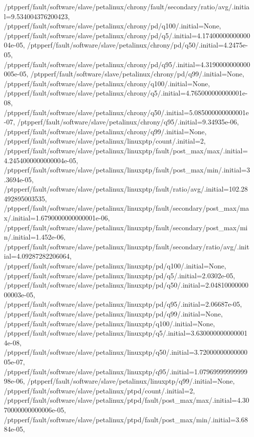 {    /ptpperf/fault/software/slave/petalinux/chrony/fault/secondary/ratio/avg/.initial=9.534004376200423,
    /ptpperf/fault/software/slave/petalinux/chrony/pd/q100/.initial=None,
    /ptpperf/fault/software/slave/petalinux/chrony/pd/q5/.initial=4.1740000000000004e-05,
    /ptpperf/fault/software/slave/petalinux/chrony/pd/q50/.initial=4.2475e-05,
    /ptpperf/fault/software/slave/petalinux/chrony/pd/q95/.initial=4.3190000000000005e-05,
    /ptpperf/fault/software/slave/petalinux/chrony/pd/q99/.initial=None,
    /ptpperf/fault/software/slave/petalinux/chrony/q100/.initial=None,
    /ptpperf/fault/software/slave/petalinux/chrony/q5/.initial=4.765000000000001e-08,
    /ptpperf/fault/software/slave/petalinux/chrony/q50/.initial=5.085000000000001e-07,
    /ptpperf/fault/software/slave/petalinux/chrony/q95/.initial=9.34935e-06,
    /ptpperf/fault/software/slave/petalinux/chrony/q99/.initial=None,
    /ptpperf/fault/software/slave/petalinux/linuxptp/count/.initial=2,
    /ptpperf/fault/software/slave/petalinux/linuxptp/fault/post_max/max/.initial=4.2454000000000004e-05,
    /ptpperf/fault/software/slave/petalinux/linuxptp/fault/post_max/min/.initial=3.3694e-05,
    /ptpperf/fault/software/slave/petalinux/linuxptp/fault/ratio/avg/.initial=102.28492895003535,
    /ptpperf/fault/software/slave/petalinux/linuxptp/fault/secondary/post_max/max/.initial=1.6790000000000001e-06,
    /ptpperf/fault/software/slave/petalinux/linuxptp/fault/secondary/post_max/min/.initial=1.452e-06,
    /ptpperf/fault/software/slave/petalinux/linuxptp/fault/secondary/ratio/avg/.initial=4.09287282206064,
    /ptpperf/fault/software/slave/petalinux/linuxptp/pd/q100/.initial=None,
    /ptpperf/fault/software/slave/petalinux/linuxptp/pd/q5/.initial=2.0302e-05,
    /ptpperf/fault/software/slave/petalinux/linuxptp/pd/q50/.initial=2.0481000000000003e-05,
    /ptpperf/fault/software/slave/petalinux/linuxptp/pd/q95/.initial=2.06687e-05,
    /ptpperf/fault/software/slave/petalinux/linuxptp/pd/q99/.initial=None,
    /ptpperf/fault/software/slave/petalinux/linuxptp/q100/.initial=None,
    /ptpperf/fault/software/slave/petalinux/linuxptp/q5/.initial=3.6300000000000014e-08,
    /ptpperf/fault/software/slave/petalinux/linuxptp/q50/.initial=3.7200000000000005e-07,
    /ptpperf/fault/software/slave/petalinux/linuxptp/q95/.initial=1.0796999999999998e-06,
    /ptpperf/fault/software/slave/petalinux/linuxptp/q99/.initial=None,
    /ptpperf/fault/software/slave/petalinux/ptpd/count/.initial=2,
    /ptpperf/fault/software/slave/petalinux/ptpd/fault/post_max/max/.initial=4.3070000000000006e-05,
    /ptpperf/fault/software/slave/petalinux/ptpd/fault/post_max/min/.initial=3.6884e-05,
}
